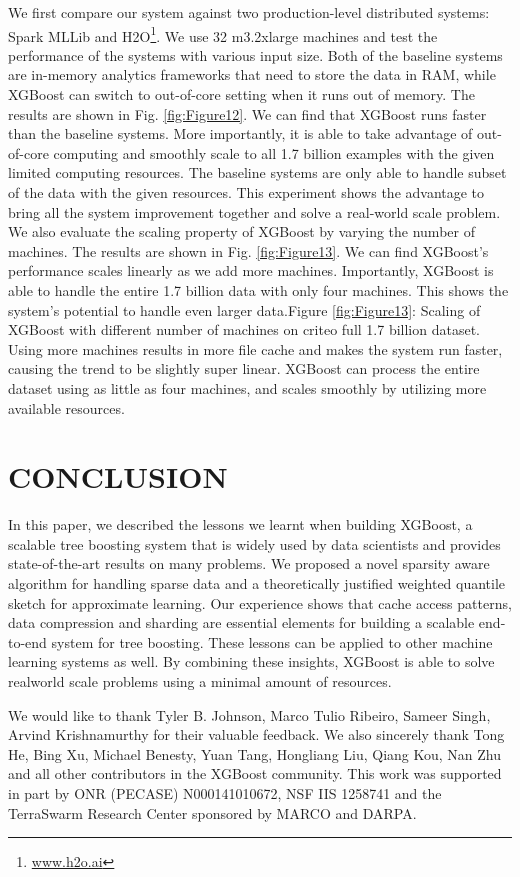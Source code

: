 \documentclass[sigconf]{acmart}
\begin{document}
We first compare our system against two production-level distributed systems: Spark MLLib \cite{meng2016mllib} and H2O\footnote{\url{www.h2o.ai}}. We use
32 m3.2xlarge machines and test the performance of the systems with various input size. Both of the baseline systems
are in-memory analytics frameworks that need to store the data in RAM, while XGBoost can switch to out-of-core setting 
when it runs out of memory. The results are shown in Fig. \ref{fig:Figure12}. We can find that XGBoost runs faster than
the baseline systems. More importantly, it is able to take advantage of out-of-core computing and smoothly scale to
all 1.7 billion examples with the given limited computing resources. The baseline systems are only able to handle subset
of the data with the given resources. This experiment shows the advantage to bring all the system improvement together 
and solve a real-world scale problem. We also evaluate the scaling property of XGBoost by varying the number of
machines. The results are shown in Fig. \ref{fig:Figure13}. We can find XGBoost’s performance scales linearly as we add more machines.
Importantly, XGBoost is able to handle the entire 1.7 billion data with only four machines. This shows the
system’s potential to handle even larger data.Figure \ref{fig:Figure13}: Scaling of XGBoost with different number of machines on criteo 
full 1.7 billion dataset. Using more machines results in more file cache and makes the system run faster, causing the trend 
to be slightly super linear. XGBoost can process the entire dataset using as little as four machines, and scales smoothly 
by utilizing more available resources.

\section{CONCLUSION}
\label{sec:CONCLUSION}
In this paper, we described the lessons we learnt when building XGBoost, a scalable tree boosting system that is
widely used by data scientists and provides state-of-the-art results on many problems. We proposed a novel sparsity
aware algorithm for handling sparse data and a theoretically justified weighted quantile sketch for approximate learning.
Our experience shows that cache access patterns, data compression and sharding are essential elements for building a
scalable end-to-end system for tree boosting. These lessons can be applied to other machine learning systems as well.
By combining these insights, XGBoost is able to solve realworld scale problems using a minimal amount of resources.

\begin{acks}
We would like to thank Tyler B. Johnson, Marco Tulio Ribeiro,
Sameer Singh, Arvind Krishnamurthy for their valuable feedback.
We also sincerely thank Tong He, Bing Xu, Michael Benesty, Yuan
Tang, Hongliang Liu, Qiang Kou, Nan Zhu and all other contributors in the XGBoost community. This work was supported
in part by ONR (PECASE) N000141010672, NSF IIS 1258741
and the TerraSwarm Research Center sponsored by MARCO and
DARPA.
\end{acks}



\end{document}
